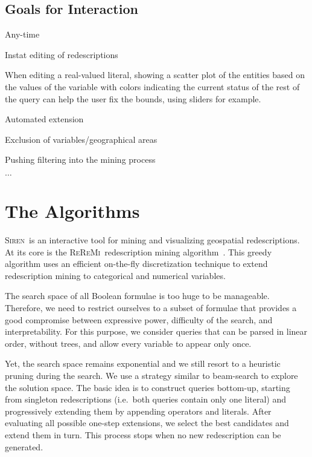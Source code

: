 \documentclass{llncs}
\renewcommand{\note}[1]{{\color{red}{#1}\par}}
\newcommand{\Siren}{\textsc{Siren}}
\newcommand{\ReReMi}{\textsc{ReReMi}}
\begin{document}
\subsection{Goals for Interaction}
\label{sec:goals-interaction}
\note{Should we use interactivity here, as a general succession of interactions?}
\note{just some buzzwords now}

Any-time

Instat editing of redescriptions

When editing a real-valued literal,
showing a scatter plot of the entities based on the values of the
variable with colors indicating the current status of the rest of the
query can help the user fix the bounds, using sliders for
example.

Automated extension

Exclusion of variables/geographical areas

Pushing filtering into the mining process

$\ldots$


\section{The Algorithms}
\label{sec:algorithms}
\note{All explanations about the workings of ReReMi \& Siren here}

\Siren\ is an interactive tool for mining and visualizing geospatial
redescriptions. At its core is the \ReReMi\ redescription mining
algorithm~\cite{galbrun11black,galbrun12black}. This greedy algorithm
uses an efficient on-the-fly discretization technique to extend
redescription mining to categorical and numerical variables.

The search space of all Boolean formulae is too huge to be manageable.
Therefore, we need to restrict ourselves to a subset of formulae that
provides a good compromise between expressive power, difficulty of the
search, and interpretability.
For this purpose, we consider queries that can be parsed in linear
order, without trees, and allow every variable to appear only once.

Yet, the search space remains exponential and we still resort to a
heuristic pruning during the search.  We use a strategy similar to
beam-search to explore the solution space.  The basic idea is to
construct queries bottom-up, starting from singleton redescriptions
(i.e.\ both queries contain only one literal) and progressively
extending them by appending operators and
literals. %
After evaluating all
possible one-step extensions, we select the best candidates and extend
them in turn. This process stops when no new redescription can
be generated.
\end{document}
